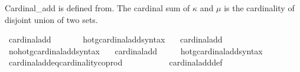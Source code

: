 \begin{isabellebody}
\endisatagproof
{\isafoldproof}%
%
\isadelimproof
%
\endisadelimproof
%
\isadelimdocument
%
\endisadelimdocument
%
\isatagdocument
%
\isamarkuptrue%
%
\endisatagdocument
{\isafolddocument}%
%
\isadelimdocument
%
\endisadelimdocument
%
\begin{isamarkuptext}%
Cardinal\_add is defined from\cite{ZFC_in_HOL_AFP}.
The cardinal sum of $\kappa$ and $\mu$ is the cardinality of disjoint union of two sets.%
\end{isamarkuptext}\isamarkuptrue%
\isamarkupfalse%
\ {\isachardoublequoteopen}cardinal{\isacharunderscore}{\kern0pt}add\ {\isasymkappa}\ {\isasymmu}\ {\isasymequiv}\ {\isacharbar}{\kern0pt}{\isasymkappa}\ {\isasymCoprod}\ {\isasymmu}{\isacharbar}{\kern0pt}{\isachardoublequoteclose}\isanewline
\isanewline
{}\isamarkupfalse%
\ hotg{\isacharunderscore}{\kern0pt}cardinal{\isacharunderscore}{\kern0pt}add{\isacharunderscore}{\kern0pt}syntax\ \ \isamarkupfalse%
\ cardinal{\isacharunderscore}{\kern0pt}add\ {\isacharparenleft}{\kern0pt}\ {\isachardoublequoteopen}{\isasymoplus}{\isachardoublequoteclose}\ {}{}{\isacharparenright}{\kern0pt}\ \isamarkupfalse%
\isanewline
{}\isamarkupfalse%
\ no{\isacharunderscore}{\kern0pt}hotg{\isacharunderscore}{\kern0pt}cardinal{\isacharunderscore}{\kern0pt}add{\isacharunderscore}{\kern0pt}syntax\ \ \isamarkupfalse%
\ cardinal{\isacharunderscore}{\kern0pt}add\ {\isacharparenleft}{\kern0pt}\ {\isachardoublequoteopen}{\isasymoplus}{\isachardoublequoteclose}\ {}{}{\isacharparenright}{\kern0pt}\ \isamarkupfalse%
\isanewline
{}\isamarkupfalse%
\ hotg{\isacharunderscore}{\kern0pt}cardinal{\isacharunderscore}{\kern0pt}add{\isacharunderscore}{\kern0pt}syntax\isanewline
\isanewline
{}\isamarkupfalse%
\ cardinal{\isacharunderscore}{\kern0pt}add{\isacharunderscore}{\kern0pt}eq{\isacharunderscore}{\kern0pt}cardinality{\isacharunderscore}{\kern0pt}coprod{\isacharcolon}{\kern0pt}\ {\isachardoublequoteopen}{\isasymkappa}\ {\isasymoplus}\ {\isasymmu}\ {\isacharequal}{\kern0pt}\ {\isacharbar}{\kern0pt}{\isasymkappa}\ {\isasymCoprod}\ {\isasymmu}{\isacharbar}{\kern0pt}{\isachardoublequoteclose}\isanewline
%
\isadelimproof
\ \ %
\endisadelimproof
%
\isatagproof
{}\isamarkupfalse%
\ cardinal{\isacharunderscore}{\kern0pt}add{\isacharunderscore}{\kern0pt}def\ \isacommand{{\isachardot}{\kern0pt}{\isachardot}{\kern0pt}}\isamarkupfalse%

\end{isabellebody}
